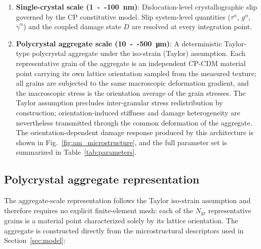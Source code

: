 \documentclass[12pt,a4paper,twocolumn]{article}
\begin{document}
\begin{enumerate}\def\labelenumi{\textbf{Scale \arabic{enumi}}:}
    \item \textbf{Single-crystal scale (\SI{1}{--}\SI{100}{\nano\meter})}: Dislocation-level crystallographic slip governed by the CP constitutive model. Slip system-level quantities ($\tau^\alpha$, $g^\alpha$, $\dot{\gamma}^\alpha$) and the coupled damage state $D$ are resolved at every integration point.
    
    \item \textbf{Polycrystal aggregate scale (\SI{10}{--}\SI{500}{\micro\meter})}: A deterministic Taylor-type polycrystal aggregate under the iso-strain (Taylor) assumption. Each representative grain of the aggregate is an independent CP-CDM material point carrying its own lattice orientation sampled from the measured texture; all grains are subjected to the same macroscopic deformation gradient, and the macroscopic stress is the orientation average of the grain stresses. The Taylor assumption precludes inter-granular stress redistribution by construction; orientation-induced stiffness and damage heterogeneity are nevertheless transmitted through the common deformation of the aggregate. The orientation-dependent damage response produced by this architecture is shown in Fig.~\ref{fig:am_microstructure}, and the full parameter set is summarized in Table~\ref{tab:parameters}.
\end{enumerate}

\subsection{Polycrystal aggregate representation}

The aggregate-scale representation follows the Taylor iso-strain assumption and therefore requires no explicit finite-element mesh: each of the $N_{\text{gr}}$ representative grains is a material point characterized solely by its lattice orientation. The aggregate is constructed directly from the microstructural descriptors used in Section~\ref{sec:model}:
\end{document}
